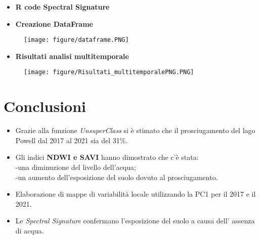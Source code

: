 \documentclass[10pt]{beamer}
\begin{document}
\begin{frame} {}
    \begin{itemize}
      \item \textbf{R code Spectral Signature}
    \end{itemize}
    \begin{mybox}
      \tiny
    \end{mybox}
\end{frame}


\begin{frame} {}
    \begin{itemize}
      \item \textbf{Creazione DataFrame}
    \end{itemize}
    \begin{figure}
       \bigskip 
       \texttt{[image: figure/dataframe.PNG]}
    \end{figure}
\end{frame}


\begin{frame} {}
    \begin{itemize}
      \item \textbf{Risultati analisi multitemporale}
    \end{itemize}
    \begin{figure}
      \bigskip 
      \texttt{[image: figure/Risultati\_multitemporalePNG.PNG]}
    \end{figure}
\end{frame}

\section {Conclusioni}
\begin{frame} 
    \begin{itemize}
      \item Grazie alla funzione \emph{UnsuperClass} si è stimato che il prosciugamento del lago Powell dal 2017 al 2021 sia del 31\%.
      \item Gli indici {\textbf{NDWI e SAVI}}  hanno dimostrato che c'è stata:
      \\-una diminuzione del livello dell'acqua;
      \\-un aumento dell'esposizione del suolo dovuto al prosciugamento.
      \item Elaborazione di mappe di variabilità locale utilizzando la PC1 per il 2017 e il 2021.
      \item Le \emph{Spectral Signature} confermano l'esposizione del suolo a causa dell' assenza di acqua.
    \end{itemize}
\end{frame}

\end{document}
